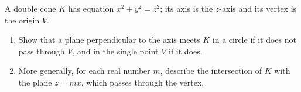 A double cone $K$ has equation $x^2+y^2=z^2$; its axis is the $z$-axis and its vertex is the origin $V$.
\begin{enumerate}
\item[(a)] Show that a plane perpendicular to the axis meets $K$ in a circle if it does not pass through $V$, and in the single point $V$ if it does.
\item[(b)] More generally, for each real number $m$, describe the intersection of $K$ with the plane $z=mx$, which passes through the vertex.
\end{enumerate}
